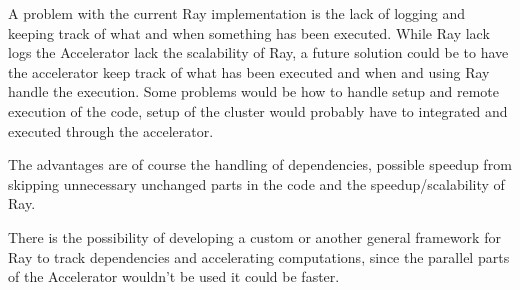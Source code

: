 \documentclass[12pt, a4paper]{article}
\begin{document}
A problem with the current Ray implementation is the lack of logging and keeping track of what and when something has been executed.
While Ray lack logs the Accelerator lack the scalability of Ray, a future solution could be to have the accelerator keep track of what has been executed and when and using Ray handle the execution.
Some problems would be how to handle setup and remote execution of the code, setup of the cluster would probably have to integrated and executed through the accelerator.

The advantages are of course the handling of dependencies, possible speedup from skipping unnecessary unchanged parts in the code and the speedup/scalability of Ray.

There is the possibility of developing a custom or another general framework for Ray to track dependencies and accelerating computations, since the parallel parts of the Accelerator wouldn't be used it could be faster.





\newpage 
\end{document}
